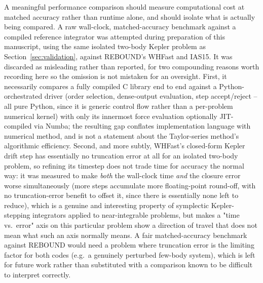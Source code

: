 \documentclass[11pt]{article}
\begin{document}

A meaningful performance comparison should measure computational cost at
matched accuracy rather than runtime alone, and should isolate what is
actually being compared. A raw wall-clock, matched-accuracy benchmark
against a compiled reference integrator was attempted during preparation of
this manuscript, using the same isolated two-body Kepler problem as
Section~\ref{sec:validation}, against REBOUND's WHFast and IAS15. It was
discarded as misleading rather than reported, for two compounding reasons
worth recording here so the omission is not mistaken for an oversight.
First, it necessarily compares a fully compiled C library end to end
against a Python-orchestrated driver (order selection, dense-output
evaluation, step accept/reject -- all pure Python, since it is generic
control flow rather than a per-problem numerical kernel) with only its
innermost force evaluation optionally JIT-compiled via Numba; the resulting
gap conflates implementation language with numerical method, and is not a
statement about the Taylor-series method's algorithmic efficiency. Second,
and more subtly, WHFast's closed-form Kepler drift step has essentially no
truncation error at all for an isolated two-body problem, so refining its
timestep does not trade time for accuracy the normal way: it was measured
to make \emph{both} the wall-clock time \emph{and} the closure error worse
simultaneously (more steps accumulate more floating-point round-off, with
no truncation-error benefit to offset it, since there is essentially none
left to reduce), which is a genuine and interesting property of symplectic
Kepler-stepping integrators applied to near-integrable problems, but makes
a "time vs.\ error" axis on this particular problem show a direction of
travel that does not mean what such an axis normally means. A fair
matched-accuracy benchmark against REBOUND would need a problem where
truncation error is the limiting factor for both codes (e.g.\ a genuinely
perturbed few-body system), which is left for future work rather than
substituted with a comparison known to be difficult to interpret correctly.
\end{document}
